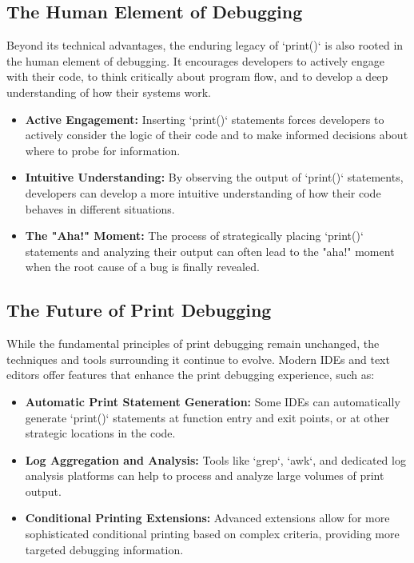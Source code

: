 \documentclass{article}
\begin{document}
{{{{\subsection*{The Human Element of Debugging}

Beyond its technical advantages, the enduring legacy of `print()` is also rooted in the human element of debugging. It encourages developers to actively engage with their code, to think critically about program flow, and to develop a deep understanding of how their systems work.

\begin{itemize}
    \item \textbf{Active Engagement:} Inserting `print()` statements forces developers to actively consider the logic of their code and to make informed decisions about where to probe for information.
    \item \textbf{Intuitive Understanding:} By observing the output of `print()` statements, developers can develop a more intuitive understanding of how their code behaves in different situations.
    \item \textbf{The "Aha!" Moment:} The process of strategically placing `print()` statements and analyzing their output can often lead to the "aha!" moment when the root cause of a bug is finally revealed.
\end{itemize}

\subsection*{The Future of Print Debugging}

While the fundamental principles of print debugging remain unchanged, the techniques and tools surrounding it continue to evolve. Modern IDEs and text editors offer features that enhance the print debugging experience, such as:

\begin{itemize}
    \item \textbf{Automatic Print Statement Generation:} Some IDEs can automatically generate `print()` statements at function entry and exit points, or at other strategic locations in the code.
    \item \textbf{Log Aggregation and Analysis:} Tools like `grep`, `awk`, and dedicated log analysis platforms can help to process and analyze large volumes of print output.
    \item \textbf{Conditional Printing Extensions:} Advanced extensions allow for more sophisticated conditional printing based on complex criteria, providing more targeted debugging information.
\end{itemize}

}}}}
\end{document}
